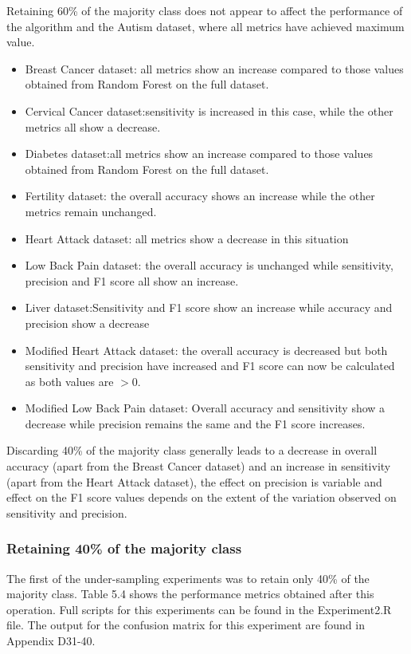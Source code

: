 Retaining 60\% of the majority class does not appear to affect the performance of the algorithm and the Autism dataset, where all metrics have achieved maximum value.
\begin{itemize}
    \item Breast Cancer dataset: all metrics show an increase compared to those values obtained from Random Forest on the full dataset.
    \item Cervical Cancer dataset:sensitivity is increased in this case, while the other metrics all show a decrease.
    \item Diabetes dataset:all metrics show an increase compared to those values obtained from Random Forest on the full dataset.
    \item Fertility dataset: the overall accuracy shows an increase while the other metrics remain unchanged.
    \item Heart Attack dataset: all metrics show a decrease in this situation
    \item Low Back Pain dataset: the overall accuracy is unchanged while sensitivity, precision and F1 score all show an increase.
    \item Liver dataset:Sensitivity and F1 score show an increase while accuracy and precision show a decrease
    \item Modified Heart Attack dataset: the overall accuracy is decreased but both sensitivity and precision have increased and F1 score can now be calculated as both values are $>$0.
    \item Modified Low Back Pain dataset: Overall accuracy and sensitivity show a decrease while precision remains the same and the F1 score increases.
\end{itemize}

Discarding 40\% of the majority class generally leads to a decrease in overall accuracy (apart from the Breast Cancer dataset) and an increase in sensitivity (apart from the Heart Attack dataset), the effect on precision is variable and effect on the F1 score values depends on the extent of the variation observed on sensitivity and precision.

\subsubsection{Retaining 40\% of the majority class}
The first of the under-sampling experiments was to retain only 40\% of the majority class. Table 5.4 shows the performance metrics obtained after this operation. Full scripts for this experiments can be found in the Experiment2.R file.
The output for the confusion matrix for this experiment are found in Appendix D31-40.

